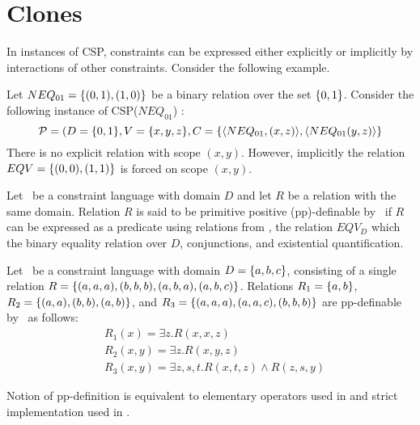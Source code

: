 \section{Clones}
In instances of CSP, constraints can be expressed either explicitly or implicitly by 
interactions of other constraints. Consider the following example.

\begin{example}
Let \(NEQ_{01}=\{{(0,1),(1,0)}\}\) be a binary relation over the set
\(\{{0,1}\}\)\@. Consider the following instance of 
CSP(\(NEQ_{01}\)) :
\[\mathcal{P}=(D=\{{0,1}\},V=\{{x,y,z}\},
 C=\{{\langle NEQ_{01},(x,z) \rangle,\langle NEQ_{01}(y,z) \rangle}\}\]
There is no explicit relation with scope \((x,y)\)\@. However, implicitly
the relation \(EQV=\{{(0,0),(1,1)}\}\) is forced on scope \((x,y)\)\@.
\end{example}

\begin{defi}[pp-definition]
Let \mrelset\ be a constraint language with domain \(D\) and 
let \(R\) be a relation with the same domain.
Relation \(R\) is said to be primitive positive (pp)-definable by \mrelset\
if \(R\) can be expressed as a predicate using relations from \mrelset,
the relation \(EQV_D\) which the binary equality relation over \(D\),  conjunctions, and
existential quantification.
\end{defi}

\begin{example} \label{example:ppd} 
Let \mrelset\ be a constraint language with domain \(D=\{{a,b,c}\}\), 
consisting of a single relation 
\(R=\{{(a,a,a),(b,b,b),(a,b,a),(a,b,c)}\}\)\@.
Relations 
\(R_1=\{{a,b}\}\), 
\(R_2=\{{(a,a),(b,b),(a,b)}\}\), 
and
\(R_3=\{{(a,a,a),(a,a,c),(b,b,b)}\}\) are pp-definable by \mrelset\ as follows:
\begin{align*}
&R_1(x)=\exists z.R(x,x,z)\\
&R_2(x,y)=\exists z.R(x,y,z)\\
&R_3(x,y)=\exists z,s,t.R(x,t,z)\land R(z,s,y)
\end{align*}
\end{example}

Notion of  pp-definition is equivalent to elementary operators used in \cite{post41,bkkr69,lau}
and strict implementation used in \cite{madu,Trichotomy}\@.

